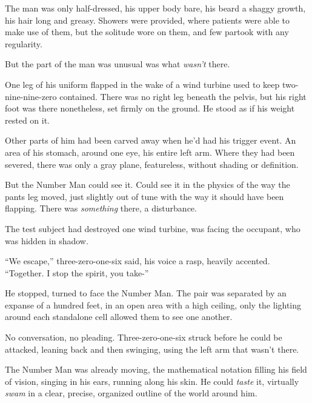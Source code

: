 The man was only half-dressed, his upper body bare, his beard a shaggy growth, his hair long and greasy.  Showers were provided, where patients were able to make use of them, but the solitude wore on them, and few partook with any regularity.



But the part of the man was unusual was what \emph{wasn't} there.



One leg of his uniform flapped in the wake of a wind turbine used to keep two-nine-nine-zero contained.  There was no right leg beneath the pelvis, but his right foot was there nonetheless, set firmly on the ground.  He stood as if his weight rested on it.



Other parts of him had been carved away when he'd had his trigger event.  An area of his stomach, around one eye, his entire left arm.  Where they had been severed, there was only a gray plane, featureless, without shading or definition.



But the Number Man could see it.  Could see it in the physics of the way the pants leg moved, just slightly out of tune with the way it should have been flapping.  There was \emph{something} there, a disturbance.



The test subject had destroyed one wind turbine, was facing the occupant, who was hidden in shadow.



``We escape,'' three-zero-one-six said, his voice a rasp, heavily accented.  ``Together.  I stop the spirit, you take-''



He stopped, turned to face the Number Man.  The pair was separated by an expanse of a hundred feet, in an open area with a high ceiling, only the lighting around each standalone cell allowed them to see one another.



No conversation, no pleading.  Three-zero-one-six struck before he could be attacked, leaning back and then swinging, using the left arm that wasn't there.



The Number Man was already moving, the mathematical notation filling his field of vision, singing in his ears, running along his skin.  He could \emph{taste} it, virtually \emph{swam }in a clear, precise, organized outline of the world around him.



